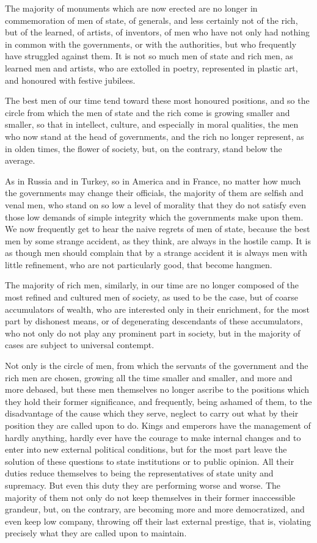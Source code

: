 \documentclass{book}
\begin{document}
The majority of monuments which are now erected are no longer in commemoration of men of state, of generals, and less certainly not of the rich, but of the learned, of artists, of inventors, of men who have not only had nothing in common with the governments, or with the authorities, but who frequently have struggled against them. It is not so much men of state and rich men, as learned men and artists, who are extolled in poetry, represented in plastic art, and honoured with festive jubilees.

The best men of our time tend toward these most honoured positions, and so the circle from which the men of state and the rich come is growing smaller and smaller, so that in intellect, culture, and especially in moral qualities, the men who now stand at the head of governments, and the rich no longer represent, as in olden times, the flower of society, but, on the contrary, stand below the average.

As in Russia and in Turkey, so in America and in France, no matter how much the governments may change their officials, the majority of them are selfish and venal men, who stand on so low a level of morality that they do not satisfy even those low demands of simple integrity which the governments make upon them. We now frequently get to hear the naive regrets of men of state, because the best men by some strange accident, as they think, are always in the hostile camp. It is as though men should complain that by a strange accident it is always men with little refinement, who are not particularly good, that become hangmen.

The majority of rich men, similarly, in our time are no longer composed of the most refined and cultured men of society, as used to be the case, but of coarse accumulators of wealth, who are interested only in their enrichment, for the most part by dishonest means, or of degenerating descendants of these accumulators, who not only do not play any prominent part in society, but in the majority of cases are subject to universal contempt.

Not only is the circle of men, from which the servants of the government and the rich men are chosen, growing all the time smaller and smaller, and more and more debased, but these men themselves no longer ascribe to the positions which they hold their former significance, and frequently, being ashamed of them, to the disadvantage of the cause which they serve, neglect to carry out what by their position they are called upon to do. Kings and emperors have the management of hardly anything, hardly ever have the courage to make internal changes and to enter into new external political conditions, but for the most part leave the solution of these questions to state institutions or to public opinion. All their duties reduce themselves to being the representatives of state unity and supremacy. But even this duty they are performing worse and worse. The majority of them not only do not keep themselves in their former inaccessible grandeur, but, on the contrary, are becoming more and more democratized, and even keep low company, throwing off their last external prestige, that is, violating precisely what they are called upon to maintain.
\end{document}
